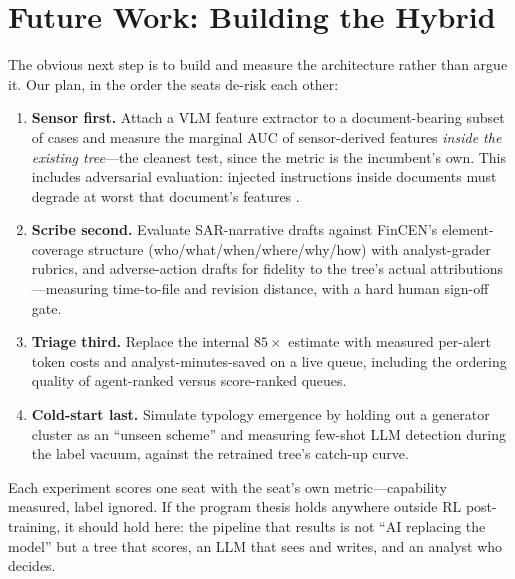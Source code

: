 \section{Future Work: Building the Hybrid}
\label{sec:p8-future}

The obvious next step is to build and measure the architecture rather than
argue it. Our plan, in the order the seats de-risk each other:

\begin{enumerate}[leftmargin=1.5em, itemsep=1pt, topsep=2pt]
\item \textbf{Sensor first.} Attach a VLM feature extractor to a
document-bearing subset of cases and measure the marginal AUC of
sensor-derived features \emph{inside the existing tree}---the cleanest test,
since the metric is the incumbent's own. This includes adversarial
evaluation: injected instructions inside documents must degrade at worst that
document's features \citep{greshake2023injection}.
\item \textbf{Scribe second.} Evaluate SAR-narrative drafts against FinCEN's
element-coverage structure (who/what/when/where/why/how)
\citep{fincen2003sarnarrative} with analyst-grader rubrics, and
adverse-action drafts for fidelity to the tree's actual attributions
\citep{cfr1002_9, cfpb2022circular}---measuring time-to-file and revision
distance, with a hard human sign-off gate.
\item \textbf{Triage third.} Replace the internal $85\times$ estimate with
measured per-alert token costs and analyst-minutes-saved on a live queue,
including the ordering quality of agent-ranked versus score-ranked queues.
\item \textbf{Cold-start last.} Simulate typology emergence by holding out a
generator cluster as an ``unseen scheme'' and measuring few-shot LLM detection
during the label vacuum, against the retrained tree's catch-up curve.
\end{enumerate}

Each experiment scores one seat with the seat's own metric---capability
measured, label ignored. If the program thesis holds anywhere outside RL
post-training, it should hold here: the pipeline that results is not ``AI
replacing the model'' but a tree that scores, an LLM that sees and writes, and
an analyst who decides.
